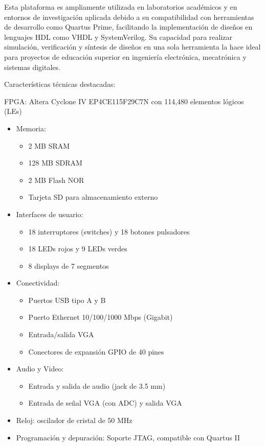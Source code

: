 Esta plataforma es ampliamente utilizada en laboratorios académicos y en entornos de investigación aplicada debido a su compatibilidad con herramientas de desarrollo como Quartus Prime, facilitando la implementación de diseños en lenguajes HDL como VHDL y SystemVerilog. Su capacidad para realizar simulación, verificación y síntesis de diseños en una sola herramienta la hace ideal para proyectos de educación superior en ingeniería electrónica, mecatrónica y sistemas digitales. 

Características técnicas destacadas:

FPGA: Altera Cyclone IV EP4CE115F29C7N con 114,480 elementos lógicos (LEs)

\begin{itemize}
	\item Memoria:
		\begin{itemize}
			\item 2 MB SRAM
			\item 128 MB SDRAM
			\item 2 MB Flash NOR
			\item Tarjeta SD para almacenamiento externo
		\end{itemize}
	\item Interfaces de usuario:
		\begin{itemize}
			\item 18 interruptores (switches) y 18 botones pulsadores
			\item 18 LEDs rojos y 9 LEDs verdes
			\item 8 displays de 7 segmentos
		\end{itemize}
	\item Conectividad:
		\begin{itemize}
			\item Puertos USB tipo A y B
			\item Puerto Ethernet 10/100/1000 Mbps (Gigabit)
			\item Entrada/salida VGA
			\item Conectores de expansión GPIO de 40 pines
		\end{itemize}
	\item Audio y Video:
		\begin{itemize}
			\item Entrada y salida de audio (jack de 3.5 mm)
			\item Entrada de señal VGA (con ADC) y salida VGA
		\end{itemize}
	\item Reloj: oscilador de cristal de 50 MHz
	\item Programación y depuración: Soporte JTAG, compatible con Quartus II
\end{itemize}
 
